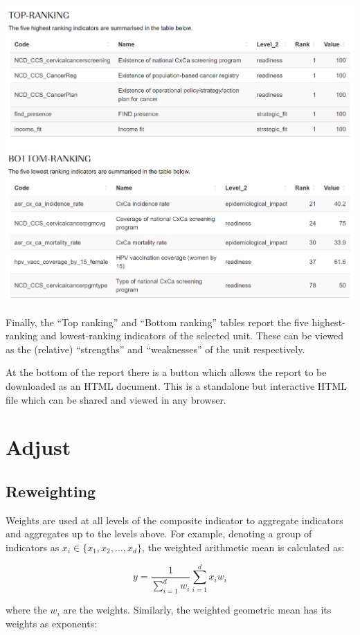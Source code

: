 \documentclass[
  letterpaper,
  DIV=11,
  numbers=noendperiod]{scrreprt}
\begin{document}
\includegraphics[width=1\textwidth,height=\textheight]{figs/profiles_3.png}

Finally, the ``Top ranking'' and ``Bottom ranking'' tables report the
five highest-ranking and lowest-ranking indicators of the selected unit.
These can be viewed as the (relative) ``strengths'' and ``weaknesses''
of the unit respectively.

At the bottom of the report there is a button which allows the report to
be downloaded as an HTML document. This is a standalone but interactive
HTML file which can be shared and viewed in any browser.

\part{Adjust}

\hypertarget{sec-reweighting}{%
\chapter{Reweighting}\label{sec-reweighting}}

Weights are used at all levels of the composite indicator to aggregate
indicators and aggregates up to the levels above. For example, denoting
a group of indicators as \(x_i \in \{x_1, x_2, ... , x_d \}\), the
weighted arithmetic mean is calculated as:

\[ y = \frac{1}{\sum_{i=1}^d w_i} \sum_{i=1}^d x_iw_i \]

where the \(w_i\) are the weights. Similarly, the weighted geometric
mean has its weights as exponents:
\end{document}

